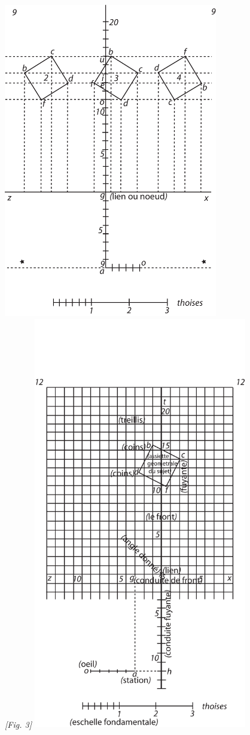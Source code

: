 \protect\clearpage\begin{center}
\includegraphics[width=0.7\textwidth]{images/T9-Desargues}
\\\textit{[Fig. 3]}
\protect\clearpage
\includegraphics[width=0.7\textwidth]{images/T12-Desargues}

\end{center}

